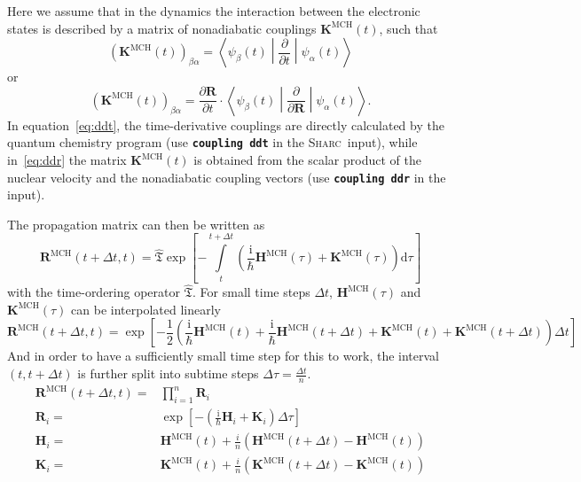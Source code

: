 \documentclass[a4paper,10pt,DIV=15,openany]{scrbook}
\newcommand{\sharc}{\textsc{Sharc}}
\newcommand{\ttt}[1]{\textbf{\texttt{#1}}}
\newcommand{\I}{\ensuremath{\mathrm{i}}}
\newcommand{\D}{\ensuremath{\mathrm{d}}}
\newcommand{\VEC}[1]{\ensuremath{\mathbf{#1}}}
\begin{document}
Here we assume that in the dynamics the interaction between the electronic states is described by a matrix of nonadiabatic couplings $\VEC{K}^{\text{MCH}}(t)$, such that
\begin{equation}
  \left(\VEC{K}^{\text{MCH}}(t)\right)_{\beta\alpha}
  =
  \left\langle
    \psi_\beta(t)
  \middle|
    \frac{\partial}{\partial t}
  \middle|
    \psi_\alpha(t)
  \right\rangle
  \label{eq:ddt}
\end{equation}
or
\begin{equation}
  \left(\VEC{K}^{\text{MCH}}(t)\right)_{\beta\alpha}
  =
  \frac{\partial \VEC{R}}{\partial t}\cdot
  \left\langle
    \psi_\beta(t)
  \middle|
    \frac{\partial}{\partial \VEC{R}}
  \middle|
    \psi_\alpha(t)
  \right\rangle.
  \label{eq:ddr}
\end{equation}
In equation~\eqref{eq:ddt}, the time-derivative couplings are directly calculated by the quantum chemistry program (use \ttt{coupling ddt} in the \sharc\ input), while in~\eqref{eq:ddr} the matrix $\VEC{K}^{\text{MCH}}(t)$ is obtained from the scalar product of the nuclear velocity and the nonadiabatic coupling vectors (use \ttt{coupling ddr} in the input).

The propagation matrix can then be written as 
\begin{equation}
  \VEC{R}^{\text{MCH}}(t+\Delta t,t)=
  \hat{\mathfrak{T}}
  \exp\left[
    -\int\limits_{t}^{t+\Delta t}
    \left(
      \frac{\I}{\hbar}\VEC{H}^{\text{MCH}}(\tau)+\VEC{K}^{\text{MCH}}(\tau) 
    \right)\D\tau
  \right]
\end{equation}
with the time-ordering operator $\hat{\mathfrak{T}}$. For small time steps $\Delta t$, $\VEC{H}^{\text{MCH}}(\tau)$ and $\VEC{K}^{\text{MCH}}(\tau)$ can be interpolated linearly
\begin{equation}
  \VEC{R}^{\text{MCH}}(t+\Delta t,t)=
  \exp\left[
    -\frac{1}{2}\left(
      \frac{\I}{\hbar}\VEC{H}^{\text{MCH}}(t)+\frac{\I}{\hbar}\VEC{H}^{\text{MCH}}(t+\Delta t)
      +\VEC{K}^{\text{MCH}}(t)+\VEC{K}^{\text{MCH}}(t+\Delta t)
    \right)\Delta t
  \right]
\end{equation}
And in order to have a sufficiently small time step for this to work, the interval $(t,t+\Delta t)$ is further split into subtime steps $\Delta\tau=\frac{\Delta t}{n}$. 
\begin{align}
  \VEC{R}^{\text{MCH}}(t+\Delta t,t)=&
  \prod\limits_{i=1}^{n}
  \VEC{R}_i\\
  \VEC{R}_i=&
  \exp\left[
      -\left(
        \frac{\I}{\hbar}\VEC{H}_i
        +\VEC{K}_i
      \right)\Delta\tau
  \right]\\
  \VEC{H}_i=&
  \VEC{H}^{\text{MCH}}(t) + \frac{i}{n}
  \left(
    \VEC{H}^{\text{MCH}}(t+\Delta t)-\VEC{H}^{\text{MCH}}(t)
  \right)\label{eq:ham_propn}\\
  \VEC{K}_i=&
  \VEC{K}^{\text{MCH}}(t) + \frac{i}{n}
  \left(
    \VEC{K}^{\text{MCH}}(t+\Delta t)-\VEC{K}^{\text{MCH}}(t)
  \right)
\end{align}
\end{document}
